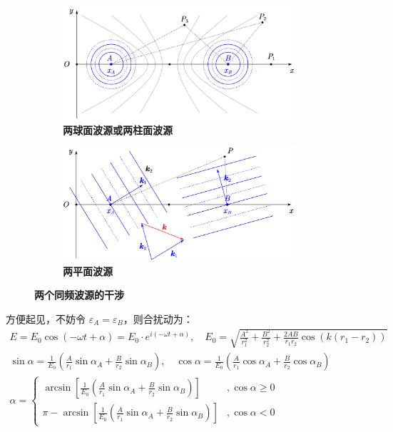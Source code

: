 \documentclass[UTF8]{report}
\theoremstyle{MyLineTheoremStyle} %
\theoremstyle{MyBlockTheoremStyle} %
\theoremstyle{MySubsubsectionStyle} %
\begin{document}
\begin{figure}[H]\centering
    \begin{subfigure}[t]{0.49\columnwidth}\centering
        \includegraphics[height=120pt]{assets/3/crop_pdf_66eff444a80a6_f690229642a2b8bc66e9fbb05793266b_66eff43590e16.pdf}
        \caption{\bfseries 两球面波源或两柱面波源 }
    \end{subfigure}\hfill
    \begin{subfigure}[t]{0.49\columnwidth}\centering
        \includegraphics[height=120pt]{assets/3/双平面波源.pdf}
        \caption{\bfseries 两平面波源 }
    \end{subfigure}
    \caption{\bfseries 两个同频波源的干涉 }\label{两个同频波源的干涉}
\end{figure}


方便起见，不妨令 $\varepsilon_A = \varepsilon_B$，则合扰动为：
\begin{gather}
E = E_0 \cos \left(-\omega t + \alpha \right) = E_0 \cdot e^{i(-\omega t + \alpha)},\quad E_0 = \sqrt{\frac{A^2}{r_1^2} + \frac{B^2}{r_2^2} + \frac{2AB}{r_1r_2}\cos\left( k \left( r_1  - r_2 \right)\right)} \\ 
\sin \alpha = \frac{1}{E_0} \left( \frac{A}{ r_1 }\sin \alpha_A + \frac{B}{ r_2 } \sin \alpha_B\right),\quad \cos \alpha = \frac{1}{E_0} \left( \frac{A}{ r_1 }\cos \alpha_A + \frac{B}{ r_2 } \cos \alpha_B\right)\\ 
\alpha = 
\begin{cases}
    \arcsin \left[ \frac{1}{E_0} \left( \frac{A}{ r_1 }\sin \alpha_A + \frac{B}{ r_2 } \sin \alpha_B\right) \right] &, \cos \alpha \geqslant 0 \\
    \pi - \arcsin \left[ \frac{1}{E_0} \left( \frac{A}{ r_1 }\sin \alpha_A + \frac{B}{ r_2 } \sin \alpha_B\right) \right] &,  \cos \alpha < 0
\end{cases}
\end{gather}
\end{document}
